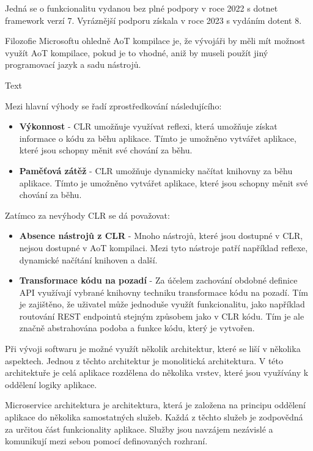 Jedná se o funkcionalitu vydanou bez plné podpory v roce 2022 s dotnet framework verzí 7. Vyráznější podporu získala v roce 2023 s vydáním dotent 8. \cite{aot}

Filozofie Microsoftu ohledně AoT kompilace je, že vývojáři by měli mít možnost využít AoT kompilace, pokud je to vhodné, aniž by museli použít jiný programovací jazyk a sadu nástrojů.

Text


Mezi hlavní výhody se řadí zprostředkování následujícího:
\begin{itemize}
    \item  \textbf{Výkonnost} - CLR umožňuje využívat reflexi, která umožňuje získat informace o kódu za běhu aplikace. Tímto je umožněno vytvářet aplikace, které jsou schopny měnit své chování za běhu.
    \item \textbf{Paměťová zátěž} - CLR umožňuje dynamicky načítat knihovny za běhu aplikace. Tímto je umožněno vytvářet aplikace, které jsou schopny měnit své chování za běhu.
\end{itemize}

Zatímco za nevýhody CLR se dá považovat:
\begin{itemize}
    \item  \textbf{Absence nástrojů z CLR} - Mnoho nástrojů, které jsou dostupné v CLR, nejsou dostupné v AoT kompilaci. Mezi tyto nástroje patří například reflexe, dynamické načítání knihoven a další.
    \item \textbf{Transformace kódu na pozadí} - Za účelem zachování obdobné definice API využívají vybrané knihovny techniku transformace kódu na pozadí. Tím je zajištěno, že uživatel může jednoduše využít funkcionalitu, jako například routování REST endpointů stejným způsobem jako v CLR kódu. Tím je ale značně abstrahována podoba a funkce kódu, který je vytvořen.
\end{itemize}

Při vývoji softwaru je možné využít několik architektur, které se liší v několika aspektech. Jednou z těchto architektur je monolitická architektura. V této architektuře je celá aplikace rozdělena do několika vrstev, které jsou využívány k oddělení logiky aplikace. \cite{monolith}

Microservice architektura je architektura, která je založena na principu oddělení aplikace do několika samostatných služeb. Každá z těchto služeb je zodpovědná za určitou část funkcionality aplikace. Služby jsou navzájem nezávislé a komunikují mezi sebou pomocí definovaných rozhraní. \cite{microservice}


